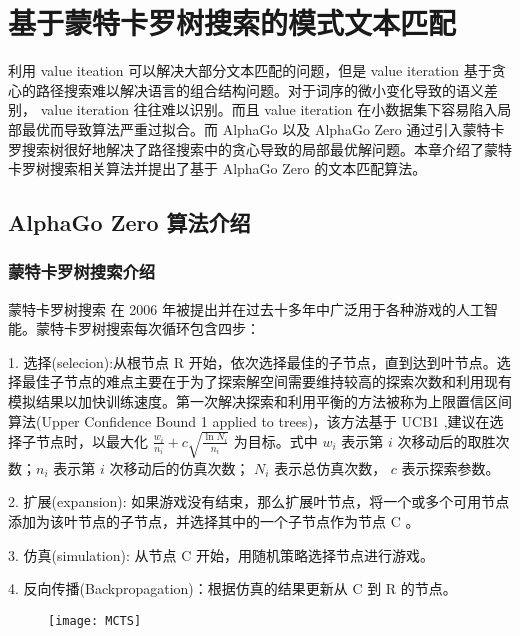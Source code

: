 \chapter{基于蒙特卡罗树搜索的模式文本匹配}
利用 value iteation 可以解决大部分文本匹配的问题，但是 value iteration 基于贪心的路径搜索难以解决语言的组合结构问题。对于词序的微小变化导致的语义差别， value iteration 往往难以识别。而且 value iteration 在小数据集下容易陷入局部最优而导致算法严重过拟合。而 AlphaGo 以及 AlphaGo Zero 通过引入蒙特卡罗搜索树很好地解决了路径搜索中的贪心导致的局部最优解问题。本章介绍了蒙特卡罗树搜索相关算法并提出了基于 AlphaGo Zero 的文本匹配算法。

\section{AlphaGo Zero 算法介绍}
\subsection{蒙特卡罗树搜索介绍}\label{sec:MCTS_intro}
蒙特卡罗树搜索\citep{Coulom2006EfficientSA} 在 2006 年被提出并在过去十多年中广泛用于各种游戏的人工智能\citep{Lorentz2008AmazonsDM, Enzenberger2010FuegoA,Buro2009ImprovingSE}。蒙特卡罗树搜索每次循环包含四步：

1. 选择(selecion):从根节点 R 开始，依次选择最佳的子节点，直到达到叶节点。选择最佳子节点的难点主要在于为了探索解空间需要维持较高的探索次数和利用现有模拟结果以加快训练速度。第一次解决探索和利用平衡的方法被称为上限置信区间算法\citep{Kocsis2006BanditBM}(Upper Confidence Bound 1 applied to trees)，该方法基于 UCB1 \citep{Auer2002FinitetimeAO},建议在选择子节点时，以最大化 $\frac{w_i}{n_i} + c\sqrt{\frac{\ln N_i}{n_i}}$ 为目标。式中 $w_i$ 表示第 $i$ 次移动后的取胜次数；$n_i$ 表示第 $i$ 次移动后的仿真次数； $N_i$ 表示总仿真次数， $c$ 表示探索参数。

2. 扩展(expansion): 如果游戏没有结束，那么扩展叶节点，将一个或多个可用节点添加为该叶节点的子节点，并选择其中的一个子节点作为节点 C 。

3. 仿真(simulation): 从节点 C 开始，用随机策略选择节点进行游戏。

4. 反向传播(Backpropagation)：根据仿真的结果更新从 C 到 R 的节点。

\begin{figure}[H]
    \centering
    \texttt{[image: MCTS]}
    \label{fig:MCTS}
\end{figure}

